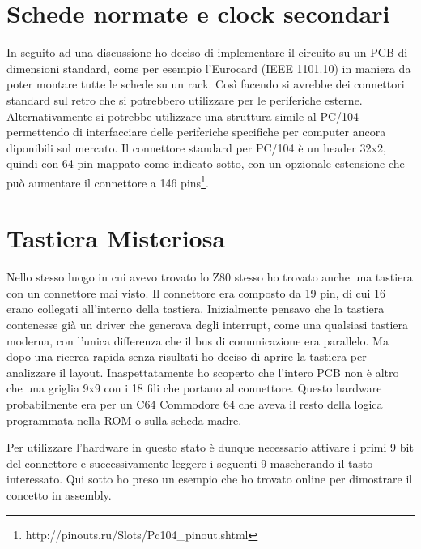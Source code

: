 \documentclass[final, ms, a4paper, 11pt]{memoir}
\newcommand\ddate{01.01.1970}
\begin{document}
\renewcommand\ddate{06.03.2017}
\section{Schede normate e clock secondari}
In seguito ad una discussione ho deciso di implementare il circuito su un PCB di
dimensioni standard, come per esempio l'Eurocard (IEEE 1101.10) in maniera da
poter montare tutte le schede su un rack. Cos\`i facendo si avrebbe dei
connettori standard sul retro che si potrebbero utilizzare per le periferiche
esterne. Alternativamente si potrebbe utilizzare una struttura simile al PC/104
permettendo di interfacciare delle periferiche specifiche per computer ancora
diponibili sul mercato. Il connettore standard per PC/104 \`e un header 32x2,
quindi con 64 pin mappato come indicato sotto, con un opzionale estensione che
pu\`o aumentare il connettore a 146
pins\footnote{http://pinouts.ru/Slots/Pc104\_pinout.shtml}.

\begin{tabular}
\end{tabular}

\renewcommand\ddate{07.03.2017}
\section{Tastiera Misteriosa}
Nello stesso luogo in cui avevo trovato lo Z80 stesso ho trovato anche una
tastiera con un connettore mai visto. Il connettore era composto da 19 pin, di
cui 16 erano collegati all'interno della tastiera. Inizialmente pensavo che la
tastiera contenesse gi\`a un driver che generava degli interrupt, come una
qualsiasi tastiera moderna, con l'unica differenza che il bus di comunicazione
era parallelo. Ma dopo una ricerca rapida senza risultati ho deciso di aprire la
tastiera per analizzare il layout. Inaspettatamente ho scoperto che l'intero PCB
non \`e altro che una griglia 9x9 con i 18 fili che portano al connettore.
Questo hardware probabilmente era per un C64 Commodore 64 che aveva il resto
della logica programmata nella ROM o sulla scheda madre.

Per utilizzare l'hardware in questo stato \`e dunque necessario attivare i
primi 9 bit del connettore e successivamente leggere i seguenti 9 mascherando il
tasto interessato. Qui sotto ho preso un esempio che ho trovato online per
dimostrare il concetto in assembly.
\end{document}
